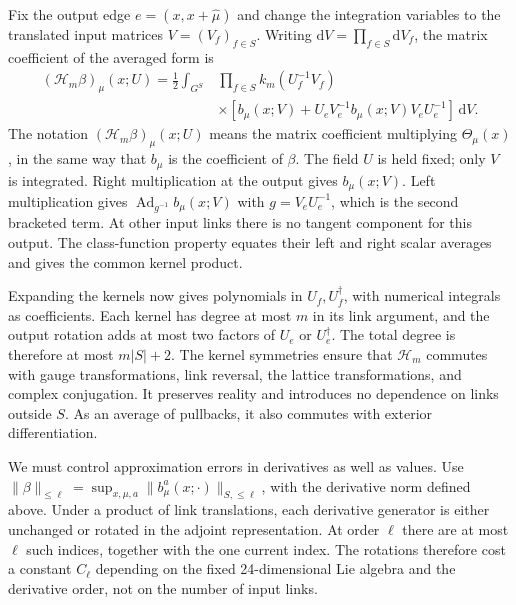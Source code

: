 \documentclass[11pt,a4paper]{article}
\theoremstyle{remark}
\DeclareMathOperator{\Ad}{Ad}
\newcommand{\dd}{\mathrm d}
\begin{document}
Fix the output edge $e=(x,x+\hat\mu)$ and change the integration
variables to the translated input matrices $V=(V_f)_{f\in S}$.
Writing $\dd V=\prod_{f\in S}\dd V_f$, the matrix coefficient of
the averaged form is
\begin{equation}
 \begin{split}
 (\mathcal H_m\beta)_\mu(x;U)=\frac12\int_{G^S}
 &\prod_{f\in S}k_m(U_f^{-1}V_f)\\[-2pt]
 &\times\left[b_\mu(x;V)
       +U_eV_e^{-1}b_\mu(x;V)V_eU_e^{-1}\right]\,\dd V .
 \end{split}
 \label{poly:coefficient-integral}
\end{equation}
The notation $(\mathcal H_m\beta)_\mu(x;U)$ means the matrix
coefficient multiplying $\Theta_\mu(x)$, in the same way that
$b_\mu$ is the coefficient of $\beta$. The field $U$ is held fixed;
only $V$ is integrated. Right multiplication at the output gives
$b_\mu(x;V)$. Left multiplication gives
$\Ad_{g^{-1}}b_\mu(x;V)$ with $g=V_eU_e^{-1}$, which is the
second bracketed term. At other input links there is no tangent
component for this output. The class-function property equates their
left and right scalar averages and gives the common kernel product.

Expanding the kernels now gives polynomials in $U_f,U_f^\dagger$,
with numerical integrals as coefficients. Each kernel has degree at most
$m$ in its link argument, and the output rotation adds at most two
factors of $U_e$ or $U_e^\dagger$. The total degree is therefore at
most $m|S|+2$. The kernel symmetries ensure that $\mathcal H_m$
commutes with gauge transformations, link reversal, the lattice
transformations, and complex conjugation. It preserves reality and
introduces no dependence on links outside $S$. As an average of
pullbacks, it also commutes with exterior differentiation.

We must control approximation errors in derivatives as well as values.
Use $\|\beta\|_{\le\ell}=\sup_{x,\mu,a}
\|b_\mu^a(x;\cdot)\|_{S,\le\ell}$, with the derivative norm
defined above. Under a product of link translations, each derivative
generator is either unchanged or rotated in the adjoint representation.
At order $\ell$ there are at most $\ell$ such indices, together
with the one current index. The rotations therefore cost a constant
$C_\ell$ depending on the fixed 24-dimensional Lie algebra and the
derivative order, not on the number of input links.
\end{document}
